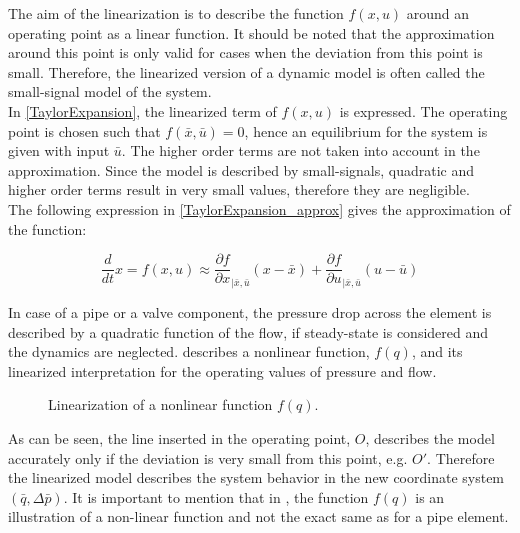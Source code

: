 The aim of the linearization is to describe the function $f(x,u)$ around an operating point as a linear function. It should be noted that the approximation around this point is only valid for cases when the deviation from this point is small. Therefore, the linearized version of a dynamic model is often called the small-signal model of the system. 
\\
In \eqref{TaylorExpansion}, the linearized term of $f(x,u)$ is expressed. The operating point is chosen such that $f(\bar{x},\bar{u}) = 0$,  hence an equilibrium for the system is given with input $\bar{u}$. The higher order terms are not taken into account in the approximation. Since the model is described by small-signals, quadratic and higher order terms result in very small values, therefore they are negligible. 
\\
The following expression in \eqref{TaylorExpansion_approx} gives the approximation of the function: 

\begin{equation}
\frac{d}{dt} x = f(x,u) \approx \frac{\partial f}{\partial x}_{|\bar{x}, \bar{u}} (x-\bar{x}) + \frac{\partial f}{\partial u}_{|\bar{x}, \bar{u}} (u-\bar{u}) 
 \label{TaylorExpansion_approx}
\end{equation}

In case of a pipe or a valve component, the pressure drop across the element is described by a quadratic function of the flow, if steady-state is considered and the dynamics are neglected.  describes a nonlinear function, $f(q)$, and its linearized interpretation for the operating values of pressure and flow. 

\begin{figure}[H]
\centering
 
\caption{Linearization of a nonlinear function $f(q).$}
\label{fig:linearization}
\end{figure}

As can be seen, the line inserted in the operating point, $O$, describes the model accurately only if the deviation is very small from this point, e.g. $O'$. Therefore the linearized model describes the system behavior in the new coordinate system $(\bar{q},\Delta \bar{p})$. It is important to mention that in , the function $f(q)$ is an illustration of a non-linear function and not the exact same as for a pipe element. 

